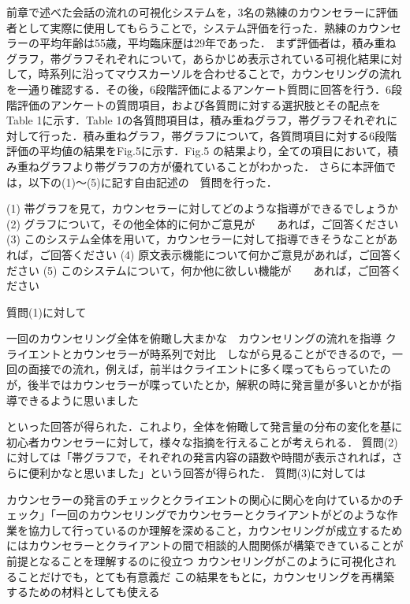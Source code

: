 \documentclass[shuuron]{kuee}
\begin{document}

  前章で述べた会話の流れの可視化システムを，3名の熟練のカウンセラーに評価者として実際に使用してもらうことで，システム評価を行った．熟練のカウンセラーの平均年齢は55歳，平均臨床歴は29年であった．
  まず評価者は，積み重ねグラフ，帯グラフそれぞれについて，あらかじめ表示されている可視化結果に対して，時系列に沿ってマウスカーソルを合わせることで，カウンセリングの流れを一通り確認する．その後，6段階評価によるアンケート質問に回答を行う．6段階評価のアンケートの質問項目，および各質問に対する選択肢とその配点をTable 1に示す．Table 1の各質問項目は，積み重ねグラフ，帯グラフそれぞれに対して行った．積み重ねグラフ，帯グラフについて，各質問項目に対する6段階評価の平均値の結果をFig.5に示す．Fig.5 の結果より，全ての項目において，積み重ねグラフより帯グラフの方が優れていることがわかった．
  さらに本評価では，以下の(1)～(5)に記す自由記述の　質問を行った．

  (1)	帯グラフを見て，カウンセラーに対してどのような指導ができるでしょうか
  (2)	グラフについて，その他全体的に何かご意見が　　あれば，ご回答ください
  (3)	このシステム全体を用いて，カウンセラーに対して指導できそうなことがあれば，ご回答ください
  (4)	原文表示機能について何かご意見があれば，ご回答ください
  (5)	このシステムについて，何か他に欲しい機能が　　あれば，ご回答ください

  質問(1)に対して

   	一回のカウンセリング全体を俯瞰し大まかな　カウンセリングの流れを指導
   	クライエントとカウンセラーが時系列で対比　しながら見ることができるので，一回の面接での流れ，例えば，前半はクライエントに多く喋ってもらっていたのが，後半ではカウンセラーが喋っていたとか，解釈の時に発言量が多いとかが指導できるように思いました

  といった回答が得られた．これより，全体を俯瞰して発言量の分布の変化を基に初心者カウンセラーに対して，様々な指摘を行えることが考えられる．
  質問(2)に対しては「帯グラフで，それぞれの発言内容の語数や時間が表示されれば，さらに便利かなと思いました」という回答が得られた．
  質問(3)に対しては

   	カウンセラーの発言のチェックとクライエントの関心に関心を向けているかのチェック」「一回のカウンセリングでカウンセラーとクライアントがどのような作業を協力して行っているのか理解を深めること，カウンセリングが成立するためにはカウンセラーとクライアントの間で相談的人間関係が構築できていることが前提となることを理解するのに役立つ
   	カウンセリングがこのように可視化されることだけでも，とても有意義だ
   	この結果をもとに，カウンセリングを再構築するための材料としても使える
\end{document}
